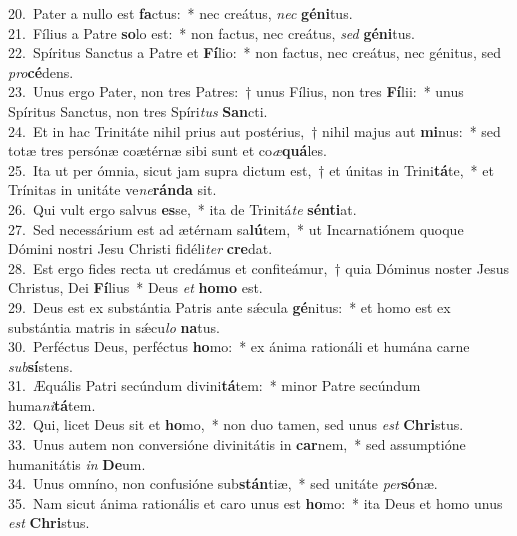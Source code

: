 {20.~}Pater a nullo est \textbf{fa}ctus:~* nec creátus, \textit{nec} \textbf{gé}\textbf{ni}tus.\\
{21.~}Fílius a Patre \textbf{so}lo est:~* non factus, nec creátus, \textit{sed} \textbf{gé}\textbf{ni}tus.\\
{22.~}Spíritus Sanctus a Patre et \textbf{Fí}lio:~* non factus, nec creátus, nec génitus, sed \textit{pro}\textbf{cé}dens.\\
{23.~}Unus ergo Pater, non tres Patres:~† unus Fílius, non tres \textbf{Fí}lii:~* unus Spíritus Sanctus, non tres Spíri\textit{tus} \textbf{San}cti.\\
{24.~}Et in hac Trinitáte nihil prius aut postérius,~† nihil majus aut \textbf{mi}nus:~* sed totæ tres persónæ coætérnæ sibi sunt et co\textit{æ}\textbf{quá}les.\\
{25.~}Ita ut per ómnia, sicut jam supra dictum est,~† et únitas in Trini\textbf{tá}te,~* et Trínitas in unitáte ve\textit{ne}\textbf{rán}\textbf{da} sit.\\
{26.~}Qui vult ergo salvus \textbf{es}se,~* ita de Trinitá\textit{te} \textbf{sén}\textbf{ti}at.\\
{27.~}Sed necessárium est ad ætérnam sa\textbf{lú}tem,~* ut Incarnatiónem quoque Dómini nostri Jesu Christi fidéli\textit{ter} \textbf{cre}dat.\\
{28.~}Est ergo fides recta ut credámus et confiteámur,~† quia Dóminus noster Jesus Christus, Dei \textbf{Fí}lius~* Deus \textit{et} \textbf{ho}\textbf{mo} est.\\
{29.~}Deus est ex substántia Patris ante sǽcula \textbf{gé}nitus:~* et homo est ex substántia matris in sǽcu\textit{lo} \textbf{na}tus.\\
{30.~}Perféctus Deus, perféctus \textbf{ho}mo:~* ex ánima rationáli et humána carne \textit{sub}\textbf{sí}stens.\\
{31.~}Æquális Patri secúndum divini\textbf{tá}tem:~* minor Patre secúndum huma\textit{ni}\textbf{tá}tem.\\
{32.~}Qui, licet Deus sit et \textbf{ho}mo,~* non duo tamen, sed unus \textit{est} \textbf{Chri}stus.\\
{33.~}Unus autem non conversióne divinitátis in \textbf{car}nem,~* sed assumptióne humanitátis \textit{in} \textbf{De}um.\\
{34.~}Unus omníno, non confusióne sub\textbf{stán}tiæ,~* sed unitáte \textit{per}\textbf{só}næ.\\
{35.~}Nam sicut ánima rationális et caro unus est \textbf{ho}mo:~* ita Deus et homo unus \textit{est} \textbf{Chri}stus.\\
